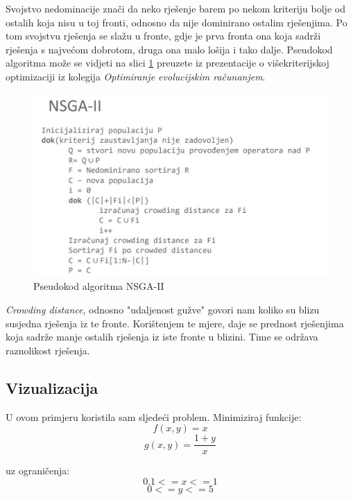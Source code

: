\documentclass[]{article}
\begin{document}
Svojstvo nedominacije znači da neko rješenje barem po nekom kriteriju bolje od ostalih koja nisu u toj fronti, odnosno da nije dominirano ostalim rješenjima. Po tom svojstvu rješenja se slažu u fronte, gdje je prva fronta ona koja sadrži rješenja s najvećom dobrotom, druga ona malo lošija i tako dalje. Pseudokod algoritma može se vidjeti na slici \ref{fig:nsgaii} preuzete iz prezentacije o višekriterijskoj optimizaciji iz kolegija \textit{Optimiranje evolucijskim računanjem}.

\begin{figure}[h]
	\includegraphics[scale=0.8]{nsgaii.jpg}
	\centering
	\caption{Pseudokod algoritma NSGA-II}
	\label{fig:nsgaii}
\end{figure}

\textit{Crowding distance}, odnosno "udaljenost gužve" govori nam koliko su blizu susjedna rješenja iz te fronte. Korištenjem te mjere, daje se prednost rješenjima koja sadrže manje ostalih rješenja iz iste fronte u blizini. Time se održava raznolikost rješenja.
\pagebreak

\subsection{Vizualizacija}

U ovom primjeru koristila sam sljedeći problem. Minimiziraj funkcije:
\begin{equation}
	f(x, y) = x
\end{equation}
\begin{equation}
	g(x, y) = \frac{1 + y}{x}
\end{equation}

uz ograničenja:
\begin{equation}
	0.1 <= x <= 1
\end{equation}
\begin{equation}
	0 <= y <= 5
\end{equation}
\end{document}
